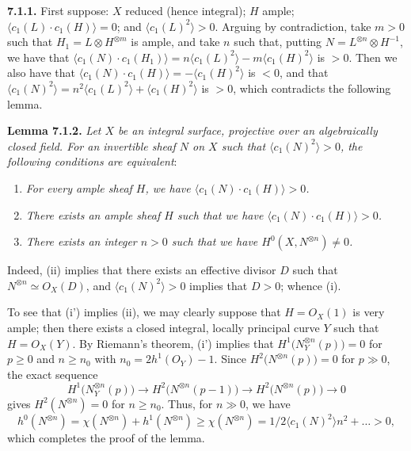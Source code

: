 \textbf{7.1.1.} First suppose: $X$ reduced (hence integral); $H$ ample; $\langle c_1(L)\cdot c_1(H)\rangle=0$; and $\langle c_1(L)^2\rangle>0$. Arguing by contradiction, take $m>0$ such that $H_1=L\otimes H^{\otimes m}$ is ample, and take $n$ such that, putting $N=L^{\otimes n}\otimes H^{-1}$, we have that $\langle c_1(N)\cdot c_1(H_1)\rangle=n\langle c_1(L)^2\rangle-m\langle c_1(H)^2\rangle$ is $>0$. Then we also have that $\langle c_1(N)\cdot c_1(H)\rangle=-\langle c_1(H)^2\rangle$ is $<0$, and that $\langle c_1(N)^2\rangle=n^2\langle c_1(L)^2\rangle+\langle c_1(H)^2\rangle$ is $>0$, which contradicts the following lemma.

\textbf{Lemma 7.1.2.} \emph{Let $X$ be an integral surface, projective over an algebraically closed field. For an invertible sheaf $N$ on $X$ such that $\langle c_1(N)^2\rangle>0$, the following conditions are equivalent}:
\begin{enumerate}[label=(\roman*)]
\item \emph{For every ample sheaf $H$, we have $\langle c_1(N)\cdot c_1(H)\rangle>0$.}
\item[(i')] \emph{There exists an ample sheaf $H$ such that we have $\langle c_1(N)\cdot c_1(H)\rangle>0$.}
\item \emph{There exists an integer $n>0$ such that we have $H^0(X,N^{\otimes n})\ne0$.}
\end{enumerate}

%
Indeed, (ii) implies that there exists an effective divisor $D$ such that $N^{\otimes n}\simeq{O}_X(D)$, and $\langle c_1(N)^2\rangle>0$ implies that $D>0$; whence (i).

To see that (i') implies (ii), we may clearly suppose that $H={O}_X(1)$ is very ample; then there exists a closed integral, locally principal curve $Y$ such that $H={O}_X(Y)$. By Riemann's theorem, (i') implies that $H^1\bigl(N_Y^{\otimes n}(p)\bigr)=0$ for $p\geq0$ and $n\geq n_0$ with $n_0=2h^1({O}_Y)-1$. Since $H^2\bigl(N^{\otimes n}(p)\bigr)=0$ for $p\gg0$, the exact sequence
\[
   H^1\bigl(N_Y^{\otimes n}(p)\bigr)
   \longrightarrow H^2\bigl(N^{\otimes n}(p-1)\bigr)
   \longrightarrow H^2\bigl(N^{\otimes n}(p)\bigr)
   \longrightarrow0
\]
gives $H^2(N^{\otimes n})=0$ for $n\geq n_0$. Thus, for $n\gg0$, we have
\[
   h^0(N^{\otimes n})
   =\chi(N^{\otimes n})+h^1(N^{\otimes n})
   \geq\chi(N^{\otimes n})
   =1/2\langle c_1(N)^2\rangle n^2+\ldots>0,
\]
which completes the proof of the lemma.

